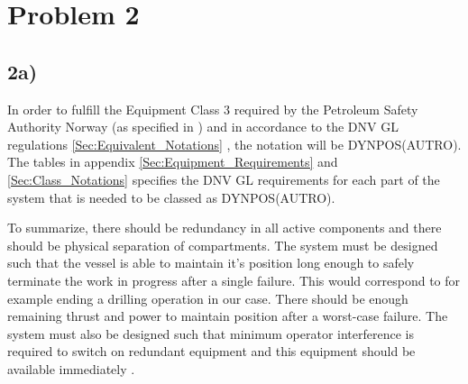 \section*{Problem 2}
\subsection*{2a)}

In order to fulfill the Equipment Class 3 required by the Petroleum Safety Authority Norway (as specified in ) and in accordance to the DNV GL regulations \ref{Sec:Equivalent_Notations} \cite{RecommendedPractices_DP_DNVGL}, the notation will be DYNPOS(AUTRO). The tables in appendix \ref{Sec:Equipment_Requirements} and \ref{Sec:Class_Notations} specifies the DNV GL requirements for each part of the system that is needed to be classed as DYNPOS(AUTRO). 

To summarize, there should be redundancy in all active components and there should be physical separation of compartments. The system must be designed such that the vessel is able to maintain it's position long enough to safely terminate the work in progress after a single failure. This would correspond to for example ending a drilling operation in our case. There should be enough remaining thrust and power to maintain position after a worst-case failure. The system must also be designed such that minimum operator interference is required to switch on redundant equipment and this equipment should be available immediately \cite{RulesShipsDNVGLPart6Chap3}.




